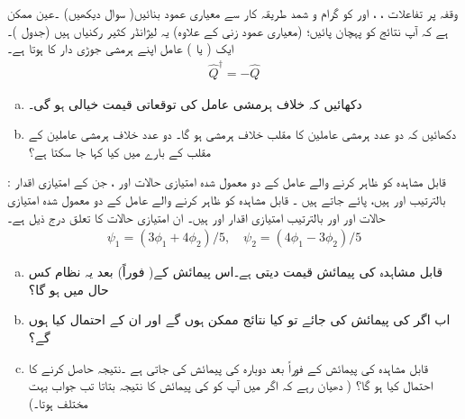  وقفہ  پر تفاعلات ، ،  اور  کو گرام و شمد طریقہ کار سے معیاری عمود بنائیں( سوال  دیکھیں) ۔عین ممکن ہے کہ آپ نتائج کو پہچان پائیں؛ (معیاری عمود زنی کے علاوہ) یہ لیژانڈر کثیر رکنیاں ہیں (جدول )۔
ایک ( یا ) عامل اپنے ہرمشی جوڑی دار کا  ہوتا ہے۔ 
 \begin{align}
 \hat{Q}^{\dagger} = -\hat{Q}
 \end{align}
\begin{enumerate}[a.]
\item
 دکھائیں کہ خلاف ہرمشی عامل کی توقعاتی قیمت خیالی ہو گی۔
\item
 دکھائیں کہ دو عدد ہرمشی عاملین کا مقلب خلاف ہرمشی ہو گا۔ دو عدد خلاف ہرمشی عاملین کے مقلب کے بارے میں کیا کہا جا سکتا ہے؟ 
\end{enumerate}
: \quad
قابل مشاہدہ  کو ظاہر کرنے والے عامل  کے دو معمول شدہ امتیازی حالات اور ، جن کے امتیازی اقدار بالترتیب اور ہیں، پائے جاتے ہیں ۔ قابل مشاہدہ  کو ظاہر کرنے والے عامل  کے دو معمول شدہ امتیازی حالات اور  اور بالترتیب امتیازی اقدار اور  ہیں۔ ان امتیازی حالات کا تعلق درج ذیل ہے۔ 
\begin{align*}
\psi_{1} = ( 3\phi_{1} + 4\phi_{2})/5, \quad \psi_{2} = ( 4\phi_{1} - 3\phi_{2})/5
\end{align*}
\begin{enumerate}[a.]
\item 
 قابل مشاہدہ  کی پیمائش  قیمت دیتی ہے۔اس پیمائش کے( فوراً) بعد یہ نظام کس حال میں ہو گا؟ 
\item
 اب اگر  کی پیمائش کی جائے تو کیا نتائج ممکن ہوں گے اور ان کے احتمال کیا ہوں گے؟ 
\item
 قابل مشاہدہ  کی پیمائش کے فوراً بعد دوبارہ  کی پیمائش کی جاتی ہے ۔نتیجہ  حاصل کرنے کا احتمال کیا ہو گا؟ ( دھیان رہے کہ اگر میں آپ کو  کی پیمائش کا نتیجہ بتاتا تب جواب بہت مختلف ہوتا۔) 
\end{enumerate}

